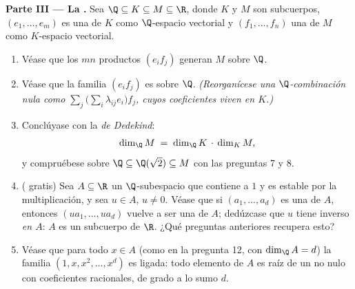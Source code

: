\begin{problem}
\medskip
\noindent\textbf{Parte III --- La .} Sea
$\Q \subseteq K \subseteq M \subseteq \R$, donde $K$ y $M$ son
subcuerpos, $(e_1, \dots, e_m)$ es una  de $K$ como
$\Q$-espacio vectorial y $(f_1, \dots, f_n)$ una  de $M$ como
$K$-espacio vectorial.
\begin{enumerate}[resume]
  \item Véase que los $mn$ productos $(e_i f_j)$ generan $M$ sobre
        $\Q$.
  \item Véase que la familia $(e_i f_j)$ es  sobre $\Q$.
        \emph{(Reorganícese una $\Q$-combinación nula como
        $\sum_j \bigl(\sum_i \lambda_{ij} e_i\bigr) f_j$, cuyos
        coeficientes  viven en $K$.)}
  \item Conclúyase con la \emph{ de Dedekind}:
        \[
        \dim_\Q M \;=\; \dim_\Q K \,\cdot\, \dim_K M ,
        \]
        y compruébese sobre $\Q \subseteq \Q(\sqrt2) \subseteq M$
        con las preguntas 7 y 8.
  \item ( gratis) Sea $A \subseteq \R$ un $\Q$-subespacio
         que contiene a $1$ y es estable por la
        multiplicación, y sea $u \in A$, $u \neq 0$. Véase que si
        $(a_1, \dots, a_d)$ es una  de $A$, entonces
        $(u a_1, \dots, u a_d)$ vuelve a ser una  de $A$;
        dedúzcase que $u$ tiene inverso \emph{en $A$}: $A$ es un
        subcuerpo de $\R$. ¿Qué preguntas anteriores recupera esto?
  \item Véase que para todo $x \in A$ (como en la pregunta 12, con
        $\dim_\Q A = d$) la familia $(1, x, x^2, \dots, x^{d})$ es
        ligada: todo elemento de $A$ es raíz de un  no nulo
        con coeficientes racionales, de grado a lo sumo $d$.
\end{enumerate}


\end{problem}
